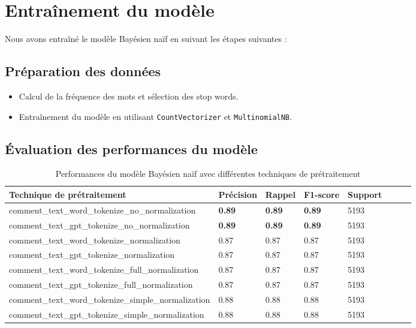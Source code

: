 \section{Entraînement du modèle}

Nous avons entraîné le modèle Bayésien naïf en suivant les étapes suivantes :

\subsection{Préparation des données}

\begin{itemize}
    \item Calcul de la fréquence des mots et sélection des stop words.
    \item Entraînement du modèle en utilisant \texttt{CountVectorizer} et \texttt{MultinomialNB}.
\end{itemize}

\subsection{Évaluation des performances du modèle}

\begin{table}[h]
    \centering
    \begin{tabular}{|l|l|l|l|l|l|l|l|}
    \hline
    \textbf{Technique de prétraitement} & \textbf{Précision} & \textbf{Rappel} & \textbf{F1-score} & \textbf{Support} \\ \hline
    comment\_text\_word\_tokenize\_no\_normalization & \textbf{0.89} & \textbf{0.89} & \textbf{0.89} & 5193 \\ \hline
    comment\_text\_gpt\_tokenize\_no\_normalization & \textbf{0.89} & \textbf{0.89} & \textbf{0.89} & 5193 \\ \hline
    comment\_text\_word\_tokenize\_normalization & 0.87 & 0.87 & 0.87 & 5193 \\ \hline
    comment\_text\_gpt\_tokenize\_normalization & 0.87 & 0.87 & 0.87 & 5193 \\ \hline
    comment\_text\_word\_tokenize\_full\_normalization & 0.87 & 0.87 & 0.87 & 5193 \\ \hline
    comment\_text\_gpt\_tokenize\_full\_normalization & 0.87 & 0.87 & 0.87 & 5193 \\ \hline
    comment\_text\_word\_tokenize\_simple\_normalization & 0.88 & 0.88 & 0.88 & 5193 \\ \hline
    comment\_text\_gpt\_tokenize\_simple\_normalization & 0.88 & 0.88 & 0.88 & 5193 \\ \hline
    \end{tabular}
    \caption{Performances du modèle Bayésien naïf avec différentes techniques de prétraitement}
\end{table}

